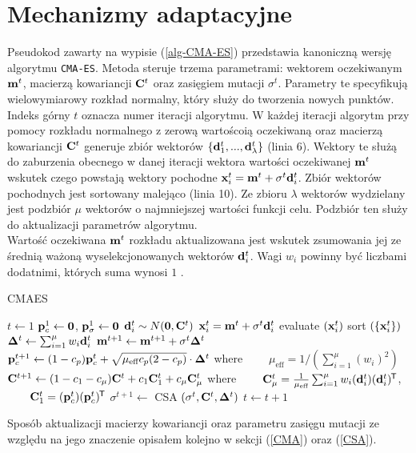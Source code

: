 \section{Mechanizmy adaptacyjne}
Pseudokod zawarty na wypisie (\ref{alg-CMA-ES}) przedstawia kanoniczną wersję algorytmu \texttt{CMA-ES}. Metoda steruje trzema parametrami: wektorem oczekiwanym ${\bf m}^{t}$, macierzą kowariancji
${\bf C}^t$ oraz zasięgiem mutacji $\sigma^t$. Parametry te specyfikują wielowymiarowy rozkład normalny, który służy do tworzenia nowych punktów. Indeks górny $t$ oznacza numer iteracji algorytmu.
W każdej iteracji algorytm przy pomocy rozkładu normalnego z zerową wartoścoią oczekiwaną oraz macierzą kowariancji ${\bf C}^t$ generuje zbiór wektorów $\{{\bf d}_1^t,...,{\bf d}_\lambda^t\}$ (linia 6). 
Wektory te służą do zaburzenia obecnego w danej iteracji wektora wartości oczekiwanej ${\bf m}^t$ wskutek czego powstają wektory pochodne ${\bf x}^t_i={\bf m}^t+\sigma^t {\bf d}_i^t$.
Zbiór wektorów pochodnych jest sortowany malejąco (linia 10). Ze zbioru $\lambda$ wektorów wydzielany jest podzbiór $\mu$ wektorów o najmniejszej wartości funkcji celu. Podzbiór ten służy do
aktualizacji parametrów algorytmu. \\
Wartość oczekiwana ${\bf m}^t$ rozkładu aktualizowana jest wskutek zsumowania jej ze średnią ważoną wyselekcjonowanych wektorów ${\bf d}_{i}^{t}$. Wagi $w_{i}$ powinny być liczbami dodatnimi, których suma wynosi $1$ \cite{HansenOstermeier01}.

\begin{algorithm}
  \renewcommand{\thealgorithm}{}
  \caption{CMAES} \label{alg-CMA-ES}
  \begin{algorithmic}[1]
  \State $t \gets 1$
\State ${\bf p}_c^1 \gets {\bf 0}$, ${\bf p}_\sigma^1 \gets {\bf 0}$
      \State $ {\bf d}_i^t \sim N({\bf 0}, {\bf C}^t) $
      \State ${\bf x}_i^t={\bf m}^{t} + \sigma^t {\bf d}_i^t $
      \State evaluate $({\bf x}_i^t)$
   \EndFor
   \State sort $ \left(\{ {\bf x}_i^t \} \right) $
   \State ${\bf \Delta}^{t} \gets \sum_{i=1}^\mu w_i {\bf d}_i^t $
   \State ${\bf m}^{t+1} \gets {\bf m}^{t+1} + \sigma^t {\bf \Delta}^{t} $
   \State ${\bf p}_c^{t+1} \gets (1-c_p){\bf p}_c^t + \sqrt{\mu_\text{eff} c_p(2-c_p)} \cdot {\bf \Delta}^{t}$ where \newline
          $\qquad \mu_\text{eff}=1/\left(\sum_{i=1}^\mu (w_i)^2\right)$
   \State ${\bf C}^{t+1} \gets (1-c_1-c_\mu){\bf C}^t + c_1 {\bf C}^t_1 + c_\mu  {\bf C}^t_\mu$ where \newline
$\qquad {\bf C}_\mu^t=\frac{1}{\mu_\text{eff}}\sum_{i=1}^\mu w_i({\bf d}_i^t)({\bf d}_i^t)^{\mkern-1.5mu\mathsf{T}}$, \newline
$\qquad {\bf C}_1^t=({\bf p}_c^t)({\bf p}_c^t)^{\mkern-1.5mu\mathsf{T}}$
   \State $\sigma^{t+1} \gets $ CSA $(\sigma^t, {\bf C}^{t}, {\bf \Delta}^{t})$ 
   \State $t \gets t+1$
\EndWhile
\end{algorithmic}
\end{algorithm}
Sposób aktualizacji macierzy kowariancji oraz parametru zasięgu mutacji ze względu na jego znaczenie opisałem kolejno w sekcji (\ref{CMA}) oraz (\ref{CSA}).
